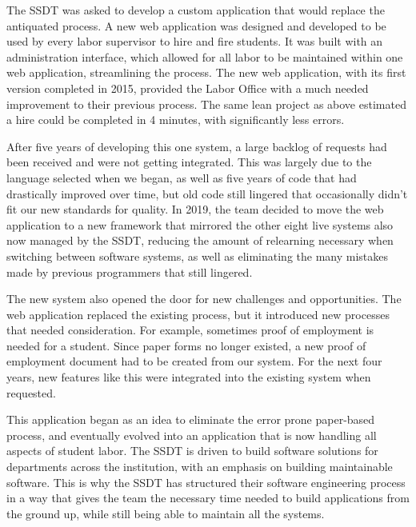 The SSDT was asked to develop a custom application that would replace the antiquated process. A new web application was designed and developed to be used by every labor supervisor to hire and fire students. It was built with an administration interface, which allowed for all labor to be maintained within one web application, streamlining the process. The new web application, with its first version completed in 2015, provided the Labor Office with a much needed improvement to their previous process. The same lean project as above estimated a hire could be completed in 4 minutes, with significantly less errors.

After five years of developing this one system, a large backlog of requests had been received and were not getting integrated. This was largely due to the language selected when we began, as well as five years of code that had drastically improved over time, but old code still lingered that occasionally didn't fit our new standards for quality. In 2019, the team decided to move the web application to a new framework that mirrored the other eight live systems also now managed by the SSDT, reducing the amount of relearning necessary when switching between software systems, as well as eliminating the many mistakes made by previous programmers that still lingered.

The new system also opened the door for new challenges and opportunities. The web application replaced the existing process, but it introduced new processes that needed consideration. For example, sometimes proof of employment is needed for a student. Since paper forms no longer existed, a new proof of employment document had to be created from our system. For the next four years, new features like this were integrated into the existing system when requested.

This application began as an idea to eliminate the error prone paper-based process, and eventually evolved into an application that is now handling all aspects of student labor. The SSDT is driven to build software solutions for departments across the institution, with an emphasis on building maintainable software. This is why the SSDT has structured their software engineering process in a way that gives the team the necessary time needed to build applications from the ground up, while still being able to maintain all the systems.
